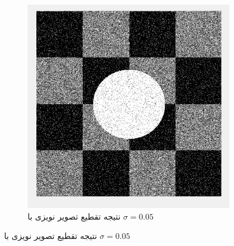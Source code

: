 \documentclass[11.5pt,a4paper]{article}
\begin{document}
\begin{figure}[h]
\begin{subfigure}{.3\textwidth}
		\includegraphics[scale=0.2]{Imgs/NB_S05_Res.png}
		\caption{نتیجه تقطیع تصویر نویزی با $\sigma=0.05$}
	\end{subfigure}


\end{figure}
\end{document}
